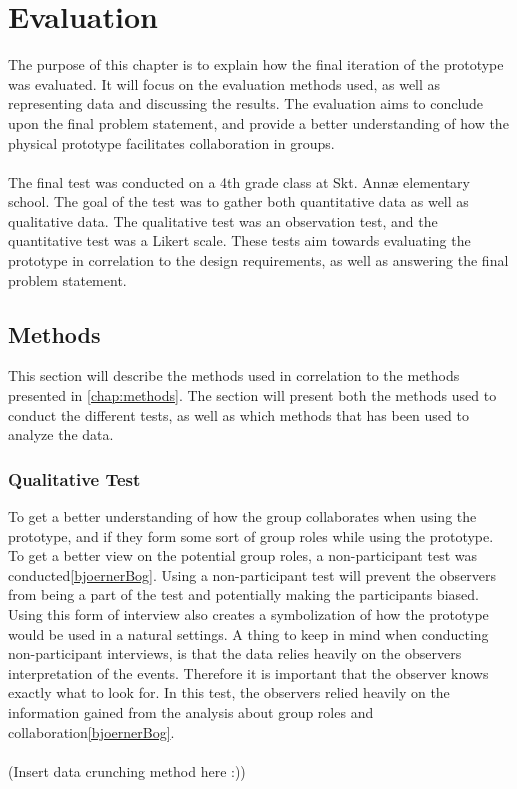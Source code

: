 \chapter{Evaluation}

The purpose of this chapter is to explain how the final iteration of the prototype was evaluated. It will focus on the evaluation methods used, as well as representing data and discussing the results. The evaluation aims to conclude upon the final problem statement, and provide a better understanding of how the physical prototype facilitates collaboration in groups.\\\\

The final test was conducted on a 4th grade class at Skt. Annæ elementary school. The goal of the test was to gather both quantitative data as well as qualitative data. The qualitative test was an observation test, and the quantitative test was a Likert scale. These tests aim towards evaluating the prototype in correlation to the design requirements, as well as answering the final problem statement.

\section{Methods}
This section will describe the methods used in correlation to the methods presented in \autoref{chap:methods}. The section will present both the methods used to conduct the different tests, as well as which methods that has been used to analyze the data. 

\subsection{Qualitative Test}
To get a better understanding of how the group collaborates when using the prototype, and if they form some sort of group roles while using the prototype. To get a better view on the potential group roles, a non-participant test was conducted\ref{bjoernerBog}. Using a non-participant test will prevent the observers from being a part of the test and potentially making the participants biased. Using this form of interview also creates a symbolization of how the prototype would be used in a natural settings. A thing to keep in mind when conducting non-participant interviews, is that the data relies heavily on the observers interpretation of the events. Therefore it is important that the observer knows exactly what to look for. In this test, the observers relied heavily on the information gained from the analysis about group roles and collaboration\ref{bjoernerBog}.\\\\
(Insert data crunching method here :))


